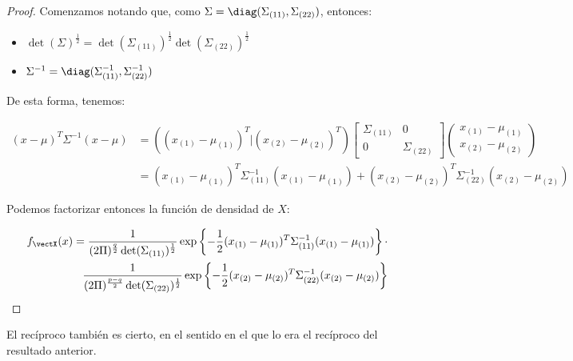   \begin{proof}
    Comenzamos notando que, como $\Sigma = \diag(\Sigma_{(11)},\Sigma_{(22)})$, entonces:
    \begin{itemize}
    \item $\det(\Sigma)^{\frac{1}{2}} = \det(\Sigma_{(11)})^{\frac{1}{2}} \det(\Sigma_{(22)})^{\frac{1}{2}}$
      \item $ \Sigma^{-1} = \diag(\Sigma_{(11)}^{-1}, \Sigma_{(22)}^{-1})$
    \end{itemize}

    De esta forma, tenemos:
    
    \[
    \begin{split}
      (x-\mu)^T \Sigma^{-1}(x-\mu) & = \left( (x_{(1)}- \mu_{(1)})^T | (x_{(2)}-\mu_{(2)})^T \right) \begin{bmatrix} \Sigma_{(11)} & 0 \\ 0 & \Sigma_{(22)} \end{bmatrix}
      \left(\begin{array}{c} x_{(1)} - \mu_{(1)} \\ \hline
        x_{(2)} - \mu_{(2)} \end{array}\right) \\
       & = (x_{(1)}- \mu_{(1)})^T \Sigma_{(11)}^{-1}  (x_{(1)}- \mu_{(1)}) +  (x_{(2)}- \mu_{(2)})^T \Sigma_{(22)}^{-1}  (x_{(2)}- \mu_{(2)})
      \end{split}
    \]
    
    Podemos factorizar entonces la función de densidad de $X$:
    
    \[
    \begin{split}
    f_{\vectX}(x) =  \frac{1}{(2\Pi)^{\frac{q}{2}} \det(\Sigma_{(11)})^{\frac{1}{2}} } \exp \left\{ - \frac{1}{2} (x_{(1)}- \mu_{(1)})^T \Sigma_{(11)}^{-1}  (x_{(1)}- \mu_{(1)})\right\} \cdot \\
    \frac{1}{(2\Pi)^{\frac{p-q}{2}} \det(\Sigma_{(22)})^{\frac{1}{2}} } \exp \left\{ - \frac{1}{2} (x_{(2)}- \mu_{(2)})^T \Sigma_{(22)}^{-1}  (x_{(2)}- \mu_{(2)})\right\}
    \end{split}
    \]
    
  \end{proof}

  El recíproco también es cierto, en el sentido en el que lo era el recíproco del resultado anterior.

